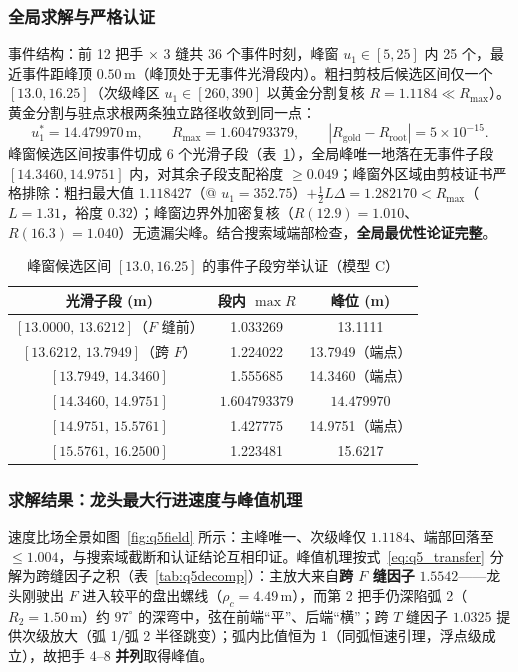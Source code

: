 ﻿\documentclass{cumcmthesis}
\begin{document}
\subsubsection{全局求解与严格认证}
事件结构：前 12 把手 $\times$ 3 缝共 36 个事件时刻，峰窗 $u_1\in[5,25]$ 内 25 个，最近事件距峰顶 $0.50\,\text{m}$（峰顶处于无事件光滑段内）。粗扫剪枝后候选区间仅一个 $[13.0,16.25]$（次级峰区 $u_1\in[260,390]$ 以黄金分割复核 $R=1.1184\ll R_{\max}$）。黄金分割与驻点求根两条独立路径收敛到同一点：
\begin{equation}
u_1^{*}=14.479970\,\text{m},\qquad
R_{\max}=1.604793379,\qquad
|R_{\text{gold}}-R_{\text{root}}|=5\times10^{-15}.
\end{equation}
峰窗候选区间按事件切成 6 个光滑子段（表~\ref{tab:q5_subseg}），全局峰唯一地落在无事件子段 $[14.3460,14.9751]$ 内，对其余子段支配裕度 $\ge0.049$；峰窗外区域由剪枝证书严格排除：粗扫最大值 $1.118427$（@ $u_1=352.75$）$+\tfrac12 L\Delta=1.282170<R_{\max}$（$L=1.31$，裕度 $0.32$）；峰窗边界外加密复核（$R(12.9)=1.010$、$R(16.3)=1.040$）无遗漏尖峰。结合搜索域端部检查，\textbf{全局最优性论证完整}。

\begin{table}[H]
\centering
\caption{峰窗候选区间 $[13.0,16.25]$ 的事件子段穷举认证（模型 C）}
\label{tab:q5_subseg}
\footnotesize
\renewcommand{\arraystretch}{1.15}
\begin{tabular}{ccc}
\toprule
光滑子段 (m) & 段内 $\max R$ & 峰位 (m) \\
\midrule
$[13.0000,\,13.6212]$（$F$ 缝前） & 1.033269 & 13.1111 \\
$[13.6212,\,13.7949]$（跨 $F$） & 1.224022 & 13.7949（端点） \\
$[13.7949,\,14.3460]$ & 1.555685 & 14.3460（端点） \\
$\mathbf{[14.3460,\,14.9751]}$ & $\mathbf{1.604793379}$ & $\mathbf{14.479970}$ \\
$[14.9751,\,15.5761]$ & 1.427775 & 14.9751（端点） \\
$[15.5761,\,16.2500]$ & 1.223481 & 15.6217 \\
\bottomrule
\end{tabular}
\end{table}

\subsubsection{求解结果：龙头最大行进速度与峰值机理}
速度比场全景如图~\ref{fig:q5field} 所示：主峰唯一、次级峰仅 $1.1184$、端部回落至 $\le1.004$，与搜索域截断和认证结论互相印证。峰值机理按式~\eqref{eq:q5_transfer} 分解为跨缝因子之积（表~\ref{tab:q5decomp}）：主放大来自\textbf{跨 $F$ 缝因子} $1.5542$——龙头刚驶出 $F$ 进入较平的盘出螺线（$\rho_c=4.49\,\text{m}$），而第 2 把手仍深陷弧 2（$R_2=1.50\,\text{m}$）约 $97^\circ$ 的深弯中，弦在前端“平”、后端“横”；跨 $T$ 缝因子 $1.0325$ 提供次级放大（弧 1/弧 2 半径跳变）；弧内比值恒为 1（同弧恒速引理，浮点级成立），故把手 4--8 \textbf{并列}取得峰值。
\end{document}
